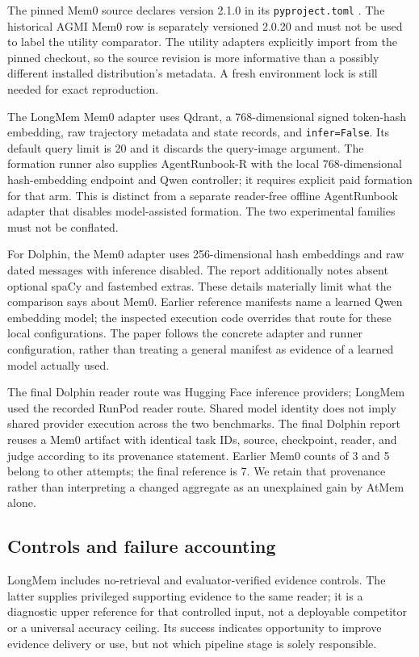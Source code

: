 \documentclass[10pt,twocolumn]{article}
\newcommand{\code}[1]{\texttt{\small #1}}
\begin{document}
The pinned Mem0 source declares version 2.1.0 in its \code{pyproject.toml} \citep{mem0source}. The historical AGMI Mem0 row is separately versioned 2.0.20 and must not be used to label the utility comparator. The utility adapters explicitly import from the pinned checkout, so the source revision is more informative than a possibly different installed distribution's metadata. A fresh environment lock is still needed for exact reproduction.

The LongMem Mem0 adapter uses Qdrant, a 768-dimensional signed token-hash embedding, raw trajectory metadata and state records, and \code{infer=False}. Its default query limit is 20 and it discards the query-image argument. The formation runner also supplies AgentRunbook-R with the local 768-dimensional hash-embedding endpoint and Qwen controller; it requires explicit paid formation for that arm. This is distinct from a separate reader-free offline AgentRunbook adapter that disables model-assisted formation. The two experimental families must not be conflated.

For Dolphin, the Mem0 adapter uses 256-dimensional hash embeddings and raw dated messages with inference disabled. The report additionally notes absent optional spaCy and fastembed extras. These details materially limit what the comparison says about Mem0. Earlier reference manifests name a learned Qwen embedding model; the inspected execution code overrides that route for these local configurations. The paper follows the concrete adapter and runner configuration, rather than treating a general manifest as evidence of a learned model actually used.

The final Dolphin reader route was Hugging Face inference providers; LongMem used the recorded RunPod reader route. Shared model identity does not imply shared provider execution across the two benchmarks. The final Dolphin report reuses a Mem0 artifact with identical task IDs, source, checkpoint, reader, and judge according to its provenance statement. Earlier Mem0 counts of 3 and 5 belong to other attempts; the final reference is 7. We retain that provenance rather than interpreting a changed aggregate as an unexplained gain by AtMem alone.

\subsection{Controls and failure accounting}
LongMem includes no-retrieval and evaluator-verified evidence controls. The latter supplies privileged supporting evidence to the same reader; it is a diagnostic upper reference for that controlled input, not a deployable competitor or a universal accuracy ceiling. Its success indicates opportunity to improve evidence delivery or use, but not which pipeline stage is solely responsible.
\end{document}
